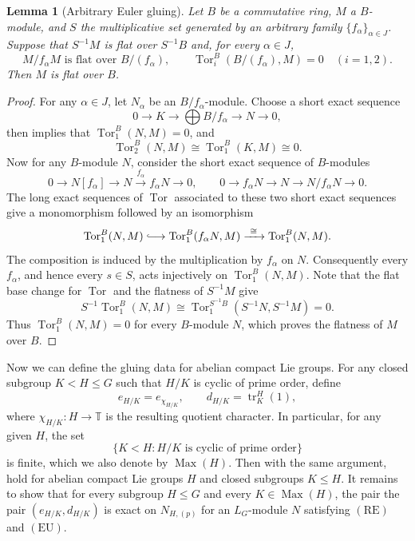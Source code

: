 \documentclass[11pt,reqno]{amsart}
\newtheorem{lemma}[lemma]{Lemma}
\newcommand{\Max}{\operatorname{Max}}
\begin{document}
\begin{lemma}[Arbitrary Euler gluing]\label{lem:compact-infinite-gluing}
Let $B$ be a commutative ring, $M$ a $B$-module, and $S$ the multiplicative set generated by an arbitrary family $\{f_\alpha\}_{\alpha\in J}$. Suppose that $S^{-1}M$ is flat over
$S^{-1}B$ and, for every $\alpha\in J$,
\[
M/f_\alpha M\text{ is flat over }B/(f_\alpha),
\qquad
\operatorname{Tor}_i^B(B/(f_\alpha),M)=0\quad(i=1,2).
\]
Then $M$ is flat over $B$.
\end{lemma}
\begin{proof}
For any $\alpha \in J$, let $N_\alpha$ be an $B/f_\alpha$-module. Choose a short exact sequence
\[
0\to K \to \bigoplus B/f_\alpha \to N \to 0,
\]
then \cite[Lemma 10.99.8]{stacks-project} implies that $\operatorname{Tor}_1^B(N,M)=0$, and 
\[ 
\operatorname{Tor}_2^B(N,M)\cong \operatorname{Tor}_1^B(K,M)\cong 0.
\]
Now for any $B$-module $N$, consider the short exact sequence of $B$-modules
\[
0\longrightarrow N[f_\alpha]\longrightarrow N\xrightarrow{f_\alpha}f_\alpha N
\longrightarrow0,
\qquad
0\longrightarrow f_\alpha N\longrightarrow N\longrightarrow N/f_\alpha N
\longrightarrow0.
\]
The long exact sequences of $\operatorname{Tor}$ associated to these two short exact sequences give a monomorphism followed by an isomorphism
\[
\operatorname{Tor}_1^B(N,M)\lhook\joinrel\longrightarrow
\operatorname{Tor}_1^B(f_\alpha N,M)\xrightarrow{\ \cong\ }\operatorname{Tor}_1^B(N,M).
\]
The composition is induced by the multiplication by $f_\alpha$ on $N$. Consequently every $f_\alpha$, and hence every $s\in S$, acts injectively on $\operatorname{Tor}_1^B(N,M)$. Note that the flat base change for $\operatorname{Tor}$ and the flatness of $S^{-1}M$ give
\[
S^{-1}\operatorname{Tor}_1^B(N,M)\cong
\operatorname{Tor}_1^{S^{-1}B}(S^{-1}N,S^{-1}M)=0.
\]
Thus $\operatorname{Tor}_1^B(N,M)=0$ for every $B$-module $N$, which proves the flatness of $M$ over $B$.
\end{proof}

Now we can define the gluing data for abelian compact Lie groups. For any closed subgroup $K< H \leq G$ such that $H/K$ is cyclic of prime order, define
\[
e_{H/K}=e_{\chi_{H/K}},\qquad
d_{H/K}=\operatorname{tr}_K^H(1),
\]
where $\chi_{H/K}:H\to\mathbb T$ is the resulting quotient character. In particular, for any given $H$, the set 
\[
\{K<H:H/K\text{ is cyclic of prime order}\}
\]
is finite, which we also denote by $\Max(H)$. Then with the same argument,  hold for abelian compact Lie groups $H$ and closed subgroups $K\leq H$. It remains to show that for every subgroup $H\leq G$ and every $K\in\Max(H)$, the pair the pair $(e_{H/K},d_{H/K})$ is exact on $N_{H,(p)}$ for an $L_G$-module $N$ satisfying $(\mathrm{RE})$ and $(\mathrm{EU})$. 
\end{document}
